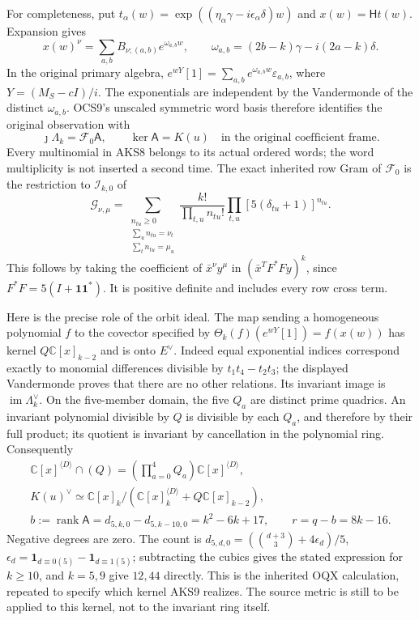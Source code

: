 \documentclass[11pt,a4paper]{article}
\begin{document}
For completeness, put $t_\alpha(w)=\exp((\eta_\alpha\gamma-
 i\epsilon_\alpha\delta)w)$ and $x(w)=\mathsf Ht(w)$. Expansion gives
\[
 x(w)^\nu=\sum_{a,b}B_{\nu;(a,b)}e^{\omega_{a,b}w},\qquad
 \omega_{a,b}=(2b-k)\gamma-i(2a-k)\delta.
\]
In the original primary algebra,
$e^{wY}[1]=\sum_{a,b}e^{\omega_{a,b}w}\varepsilon_{a,b}$, where
$Y=(M_S-cI)/i$. The exponentials are independent by the Vandermonde of
the distinct $\omega_{a,b}$. OCS9's unscaled symmetric word basis
therefore identifies the original observation with
\[
       \jmath\Lambda_k=\mathcal F_0\mathsf A,
       \qquad\ker\mathsf A=K(u)
       \quad\text{in the original coefficient frame.}
       \tag{AKS9}
\]
Every multinomial in AKS8 belongs to its actual ordered words; the
word multiplicity is not inserted a second time. The exact inherited
row Gram of $\mathcal F_0$ is the restriction to $\mathcal I_{k,0}$ of
\[
 \mathcal G_{\nu,\mu}=
 \sum_{\substack{n_{tu}\ge0\\\sum_u n_{tu}=\nu_t\\
                              \sum_t n_{tu}=\mu_u}}
 \frac{k!}{\prod_{t,u}n_{tu}!}\prod_{t,u}
          [5(\delta_{tu}+1)]^{n_{tu}}.
 \tag{AKS10}
\]
This follows by taking the coefficient of $\bar x^\nu y^\mu$ in
$(\bar x^TF^*Fy)^k$, since $F^*F=5(I+\mathbf1\mathbf1^*)$. It is positive
definite and includes every row cross term.

Here is the precise role of the orbit ideal. The map sending a homogeneous
polynomial $f$ to the covector specified by
$\Theta_k(f)(e^{wY}[1])=f(x(w))$ has kernel
$Q\mathbb C[x]_{k-2}$ and is onto $E^\vee$. Indeed equal exponential
indices correspond exactly to monomial differences divisible by
$t_1t_4-t_2t_3$; the displayed Vandermonde proves that there are no other
relations. Its invariant image is $\operatorname{im}\Lambda_k^\vee$.
On the five-member domain, the five $Q_a$ are distinct prime quadrics.
An invariant polynomial divisible by $Q$ is divisible by each $Q_a$,
and therefore by their full product; its quotient is invariant by
cancellation in the polynomial ring. Consequently
\[
\begin{gathered}
 \mathbb C[x]^{\langle D\rangle}\cap (Q)
       =\left(\prod_{a=0}^4Q_a\right)\mathbb C[x]^{\langle D\rangle},\\
 K(u)^\vee\simeq
 \mathbb C[x]_k\big/(\mathbb C[x]_k^{\langle D\rangle}
                              +Q\mathbb C[x]_{k-2}),\\
 b:=\operatorname{rank}\mathsf A
     =d_{5,k,0}-d_{5,k-10,0}=k^2-6k+17,\qquad r=q-b=8k-16.
\end{gathered}\tag{AKS11}
\]
Negative degrees are zero. The count is
$d_{5,d,0}=(\binom{d+3}{3}+4\epsilon_d)/5$,
$\epsilon_d=\mathbf1_{d\equiv0(5)}-\mathbf1_{d\equiv1(5)}$;
subtracting the cubics gives the stated expression for $k\ge10$, and
$k=5,9$ give $12,44$ directly. This is the inherited OQX calculation,
repeated to specify which kernel AKS9 realizes. The source metric is
still to be applied to this kernel, not to the invariant ring itself.
\end{document}
